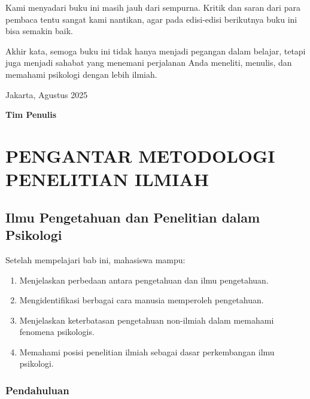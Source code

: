 \documentclass[
  indonesian,
  letterpaper,
  DIV=11,
  numbers=noendperiod]{scrreprt}
\providecommand{\tightlist}{%
  \setlength{\itemsep}{0pt}\setlength{\parskip}{0pt}}
\begin{document}
Kami menyadari buku ini masih jauh dari sempurna. Kritik dan saran dari
para pembaca tentu sangat kami nantikan, agar pada edisi-edisi
berikutnya buku ini bisa semakin baik.

Akhir kata, semoga buku ini tidak hanya menjadi pegangan dalam belajar,
tetapi juga menjadi sahabat yang menemani perjalanan Anda meneliti,
menulis, dan memahami psikologi dengan lebih ilmiah.

Jakarta, Agustus 2025

\textbf{Tim Penulis}

\part{PENGANTAR METODOLOGI PENELITIAN ILMIAH}

\chapter{Ilmu Pengetahuan dan Penelitian dalam
Psikologi}\label{ilmu-pengetahuan-dan-penelitian-dalam-psikologi}

\begin{tcolorbox}[enhanced jigsaw, colframe=quarto-callout-note-color-frame, toptitle=1mm, breakable, leftrule=.75mm, arc=.35mm, toprule=.15mm, colback=white, colbacktitle=quarto-callout-note-color!10!white, bottomtitle=1mm, bottomrule=.15mm, titlerule=0mm, title=\textcolor{quarto-callout-note-color}{\faInfo}\hspace{0.5em}{Capaian Pembelajaran}, coltitle=black, left=2mm, opacitybacktitle=0.6, opacityback=0, rightrule=.15mm]

Setelah mempelajari bab ini, mahasiswa mampu:

\begin{enumerate}
\def\labelenumi{\arabic{enumi}.}
\tightlist
\item
  Menjelaskan perbedaan antara pengetahuan dan ilmu pengetahuan.
\item
  Mengidentifikasi berbagai cara manusia memperoleh pengetahuan.
\item
  Menjelaskan keterbatasan pengetahuan non-ilmiah dalam memahami
  fenomena psikologis.
\item
  Memahami posisi penelitian ilmiah sebagai dasar perkembangan ilmu
  psikologi.
\end{enumerate}

\end{tcolorbox}

\section{Pendahuluan}\label{pendahuluan}
\end{document}
